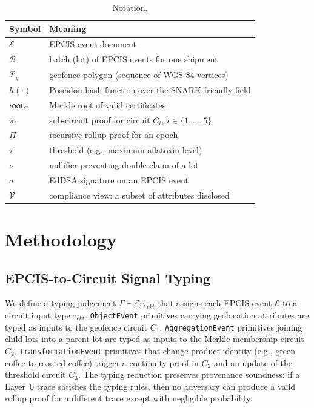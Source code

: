 \documentclass[journal]{IEEEtran}
\begin{document}
\begin{table}[h]
\centering
\caption{Notation.}
\label{tab:notation}
\begin{tabular}{ll}
\toprule
Symbol & Meaning \\
\midrule
$\mathcal{E}$ & EPCIS event document \\
$\mathcal{B}$ & batch (lot) of EPCIS events for one shipment \\
$\mathcal{P}_g$ & geofence polygon (sequence of WGS-84 vertices) \\
$h(\cdot)$ & Poseidon hash function over the SNARK-friendly field \\
$\mathsf{root}_C$ & Merkle root of valid certificates \\
$\pi_i$ & sub-circuit proof for circuit $C_i$, $i \in \{1,\dots,5\}$ \\
$\Pi$ & recursive rollup proof for an epoch \\
$\tau$ & threshold (e.g., maximum aflatoxin level) \\
$\nu$ & nullifier preventing double-claim of a lot \\
$\sigma$ & EdDSA signature on an EPCIS event \\
$\mathcal{V}$ & compliance view: a subset of attributes disclosed \\
\bottomrule
\end{tabular}
\end{table}

\section{Methodology}
\label{sec:method}

\subsection{EPCIS-to-Circuit Signal Typing}
We define a typing judgement $\Gamma \vdash \mathcal{E} : \tau_{ckt}$ that assigns each EPCIS event $\mathcal{E}$ to a circuit input type $\tau_{ckt}$. \texttt{ObjectEvent} primitives carrying geolocation attributes are typed as inputs to the geofence circuit $C_1$. \texttt{AggregationEvent} primitives joining child lots into a parent lot are typed as inputs to the Merkle membership circuit $C_2$. \texttt{TransformationEvent} primitives that change product identity (e.g., green coffee to roasted coffee) trigger a continuity proof in $C_2$ and an update of the threshold circuit $C_3$. The typing reduction preserves provenance soundness: if a Layer~0 trace satisfies the typing rules, then no adversary can produce a valid rollup proof for a different trace except with negligible probability.
\end{document}
